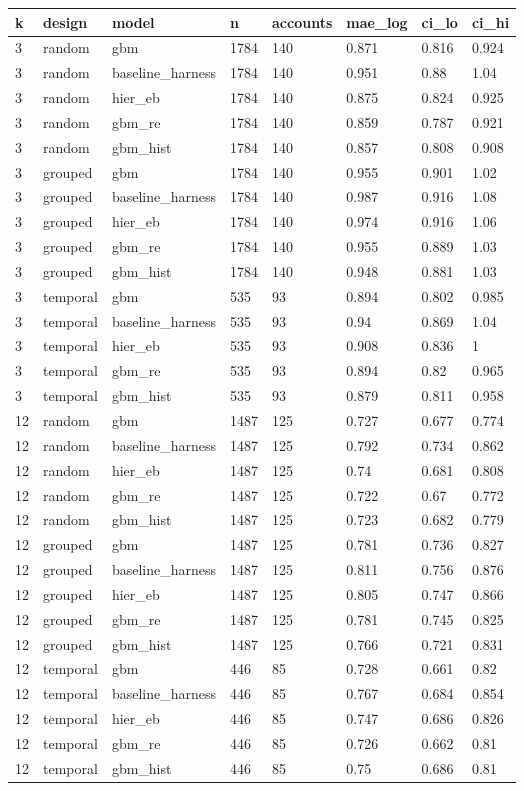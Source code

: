 \begin{tabular}{llllllll}
\toprule
k & design & model & n & accounts & mae\_log & ci\_lo & ci\_hi \\
\midrule
3 & random & gbm & 1784 & 140 & 0.871 & 0.816 & 0.924 \\
3 & random & baseline\_harness & 1784 & 140 & 0.951 & 0.88 & 1.04 \\
3 & random & hier\_eb & 1784 & 140 & 0.875 & 0.824 & 0.925 \\
3 & random & gbm\_re & 1784 & 140 & 0.859 & 0.787 & 0.921 \\
3 & random & gbm\_hist & 1784 & 140 & 0.857 & 0.808 & 0.908 \\
3 & grouped & gbm & 1784 & 140 & 0.955 & 0.901 & 1.02 \\
3 & grouped & baseline\_harness & 1784 & 140 & 0.987 & 0.916 & 1.08 \\
3 & grouped & hier\_eb & 1784 & 140 & 0.974 & 0.916 & 1.06 \\
3 & grouped & gbm\_re & 1784 & 140 & 0.955 & 0.889 & 1.03 \\
3 & grouped & gbm\_hist & 1784 & 140 & 0.948 & 0.881 & 1.03 \\
3 & temporal & gbm & 535 & 93 & 0.894 & 0.802 & 0.985 \\
3 & temporal & baseline\_harness & 535 & 93 & 0.94 & 0.869 & 1.04 \\
3 & temporal & hier\_eb & 535 & 93 & 0.908 & 0.836 & 1 \\
3 & temporal & gbm\_re & 535 & 93 & 0.894 & 0.82 & 0.965 \\
3 & temporal & gbm\_hist & 535 & 93 & 0.879 & 0.811 & 0.958 \\
12 & random & gbm & 1487 & 125 & 0.727 & 0.677 & 0.774 \\
12 & random & baseline\_harness & 1487 & 125 & 0.792 & 0.734 & 0.862 \\
12 & random & hier\_eb & 1487 & 125 & 0.74 & 0.681 & 0.808 \\
12 & random & gbm\_re & 1487 & 125 & 0.722 & 0.67 & 0.772 \\
12 & random & gbm\_hist & 1487 & 125 & 0.723 & 0.682 & 0.779 \\
12 & grouped & gbm & 1487 & 125 & 0.781 & 0.736 & 0.827 \\
12 & grouped & baseline\_harness & 1487 & 125 & 0.811 & 0.756 & 0.876 \\
12 & grouped & hier\_eb & 1487 & 125 & 0.805 & 0.747 & 0.866 \\
12 & grouped & gbm\_re & 1487 & 125 & 0.781 & 0.745 & 0.825 \\
12 & grouped & gbm\_hist & 1487 & 125 & 0.766 & 0.721 & 0.831 \\
12 & temporal & gbm & 446 & 85 & 0.728 & 0.661 & 0.82 \\
12 & temporal & baseline\_harness & 446 & 85 & 0.767 & 0.684 & 0.854 \\
12 & temporal & hier\_eb & 446 & 85 & 0.747 & 0.686 & 0.826 \\
12 & temporal & gbm\_re & 446 & 85 & 0.726 & 0.662 & 0.81 \\
12 & temporal & gbm\_hist & 446 & 85 & 0.75 & 0.686 & 0.81 \\
\bottomrule
\end{tabular}